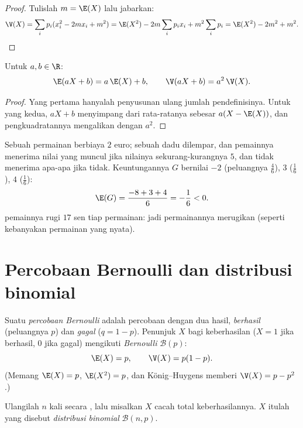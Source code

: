 \begin{proof}
Tulislah $m = \E(X)$ lalu jabarkan:
\[
\V(X) = \sum_i p_i (x_i^2 - 2m x_i + m^2)
= \E(X^2) - 2m\sum_i p_i x_i + m^2\sum_i p_i
= \E(X^2) - 2m^2 + m^2 . \qedhere
\]
\end{proof}

\begin{proposition}\label{prop:g12:randvar:affine}
Untuk $a, b \in \R$:
\[
\E(aX + b) = a\,\E(X) + b, \qquad
\V(aX + b) = a^2\,\V(X) .
\]
\end{proposition}

\begin{proof}
Yang pertama hanyalah penyusunan ulang jumlah pendefinisinya. Untuk yang kedua, $aX + b$
menyimpang dari rata-ratanya sebesar $a(X - \E(X))$, dan pengkuadratannya mengalikan
dengan $a^2$.
\end{proof}

\begin{example}\label{ex:g12:randvar:game}
Sebuah permainan berbiaya $2$ euro; sebuah dadu dilempar, dan pemainnya menerima nilai
yang muncul jika nilainya sekurang-kurangnya $5$, dan tidak menerima apa-apa jika tidak. Keuntungannya $G$ bernilai
$-2$ (peluangnya $\frac46$), $3$ ($\frac16$), $4$ ($\frac16$):
\[
\E(G) = \frac{-8 + 3 + 4}{6} = -\frac{1}{6} < 0 .
\]
 pemainnya rugi $17$ sen tiap permainan: jadi permainannya merugikan
(seperti kebanyakan permainan yang nyata).
\end{example}

\section{Percobaan Bernoulli dan distribusi binomial}

\begin{definition}\label{def:g12:randvar:bernoulli}
Suatu \emph{percobaan Bernoulli} adalah percobaan dengan dua
hasil, \emph{berhasil} (peluangnya $p$) dan \emph{gagal}
($q = 1 - p$). Penunjuk $X$ bagi keberhasilan ($X = 1$ jika berhasil, $0$ jika
gagal) mengikuti \emph{ Bernoulli} $\mathcal B(p)$:
\[
\E(X) = p, \qquad \V(X) = p(1-p) .
\]
(Memang $\E(X) = p$, $\E(X^2) = p$, dan König--Huygens memberi
$\V(X) = p - p^2$.)
\end{definition}

\begin{definition}\label{def:g12:randvar:binomial}
Ulangilah  $n$ kali secara , lalu misalkan $X$ cacah
total keberhasilannya.  $X$ itulah yang disebut \emph{distribusi
binomial} $\mathcal B(n, p)$.
\end{definition}

